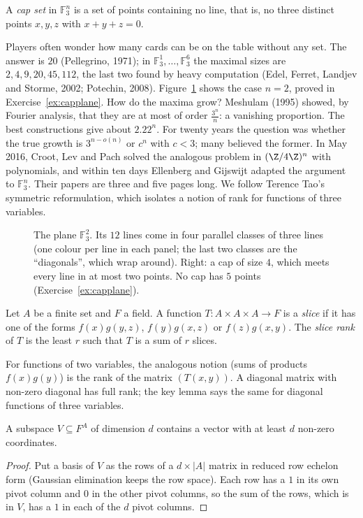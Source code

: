 \begin{definition}\label{def:cap}
A \emph{cap set} in $\mathbb F_3^n$ is a set of points containing no line, that is, no three distinct points $x,y,z$ with $x+y+z=0$.
\end{definition}

Players often wonder how many cards can be on the table without any set. The answer is $20$ (Pellegrino, 1971); in $\mathbb F_3^1,\dots,\mathbb F_3^6$ the maximal sizes are $2,4,9,20,45,112$, the last two found by
heavy computation (Edel, Ferret, Landjev and Storme, 2002; Potechin, 2008). Figure~\ref{fig:caps} shows the case $n=2$, proved in Exercise~\ref{ex:capplane}. How do the maxima grow? Meshulam (1995) showed, by
Fourier analysis, that they are at most of order $\frac{3^n}n$: a vanishing proportion. The best constructions give about $2.22^n$. For twenty years the question was whether the true growth is $3^{n-o(n)}$ or
$c^n$ with $c<3$; many believed the former. In May 2016, Croot, Lev and Pach solved the analogous problem in $(\Z/4\Z)^n$ with polynomials, and within ten days Ellenberg and Gijswijt adapted the argument to
$\mathbb F_3^n$. Their papers are three and five pages long. We follow Terence Tao's symmetric reformulation, which isolates a notion of rank for functions of three variables.

\begin{figure}[ht]
\centering
{}
\caption{The plane $\mathbb F_3^2$. Its $12$ lines come in four parallel classes of three lines (one colour per line in each panel; the last two classes are the ``diagonals'', which wrap around). Right: a cap of
size $4$, which meets every line in at most two points. No cap has $5$ points (Exercise~\ref{ex:capplane}).}
\label{fig:caps}
\end{figure}

\begin{definition}\label{def:slicerank}
Let $A$ be a finite set and $F$ a field. A function $T:A\times A\times A\to F$ is a \emph{slice} if it has one of the forms $f(x)g(y,z)$, $f(y)g(x,z)$ or $f(z)g(x,y)$. The \emph{slice rank} of $T$ is the least $r$ such
that $T$ is a sum of $r$ slices.
\end{definition}

For functions of two variables, the analogous notion (sums of products $f(x)g(y)$) is the rank of the matrix $(T(x,y))$. A diagonal matrix with non-zero diagonal has full rank; the key lemma says the same for
diagonal functions of three variables.

\begin{lemma}\label{lem:support}
A subspace $V\subseteq F^A$ of dimension $d$ contains a vector with at least $d$ non-zero coordinates.
\end{lemma}
\begin{proof}
Put a basis of $V$ as the rows of a $d\times|A|$ matrix in reduced row echelon form (Gaussian elimination keeps the row space). Each row has a $1$ in its own pivot column and $0$ in the other pivot
columns, so the sum of the rows, which is in $V$, has a $1$ in each of the $d$ pivot columns.
\end{proof}

